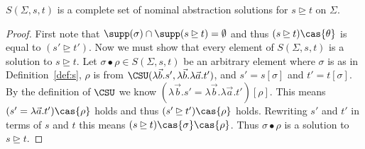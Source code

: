 \begin{theorem}
$S(\Sigma, s, t)$ is a complete set of nominal abstraction solutions
for $s\unrhd t$ on $\Sigma$.
\end{theorem}
\begin{proof}
First note that $\supp(\sigma) \cap \supp(s\unrhd t) = \emptyset$ and
thus $(s\unrhd t)\cas{\theta}$ is equal to $(s' \unrhd t')$.
Now we must show that every element of $S(\Sigma, s, t)$ is a
solution to $s \unrhd t$. Let $\sigma\bullet\rho \in S(\Sigma, s, t)$
be an arbitrary element where $\sigma$ is as in Definition~\ref{def:s},
$\rho$ is from $\CSU(\lambda\vec{b}.s',
\lambda\vec{b}.\lambda\vec{a}.t')$, and $s' = s[\sigma]$ and $t' =
t[\sigma]$.  By the definition of $\CSU$ we know $(\lambda\vec{b}.s' =
\lambda\vec{b}.\lambda\vec{a}.t')[\rho]$. This means $(s' =
\lambda\vec{a}.t')\cas{\rho}$ holds and thus $(s' \unrhd
t')\cas{\rho}$ holds. Rewriting $s'$ and $t'$ in terms of $s$ and $t$ this
means $(s \unrhd t)\cas{\sigma}\cas{\rho}$. Thus $\sigma\bullet\rho$
is a solution to $s\unrhd t$.


\end{proof}
